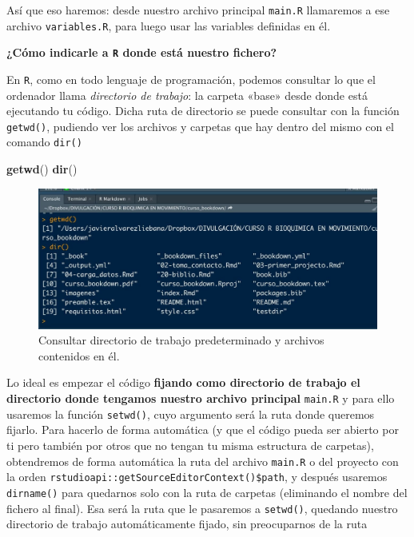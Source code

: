 \documentclass[11pt,]{book}
\newenvironment{Shaded}{\begin{snugshade}}{\end{snugshade}}
\newcommand{\KeywordTok}[1]{\textcolor[rgb]{0.27,0.27,0.27}{\textbf{#1}}}
\newcommand{\NormalTok}[1]{#1}
\begin{document}
Así que eso haremos: desde nuestro archivo principal \texttt{main.R} llamaremos a ese archivo \texttt{variables.R}, para luego usar las variables definidas en él.

\textbf{¿Cómo indicarle a \texttt{R} donde está nuestro fichero?}

En \texttt{R}, como en todo lenguaje de programación, podemos consultar lo que el ordenador llama \emph{directorio de trabajo}: la carpeta «base» desde donde está ejecutando tu código. Dicha ruta de directorio se puede consultar con la función \texttt{getwd()}, pudiendo ver los archivos y carpetas que hay dentro del mismo con el comando \texttt{dir()}

\begin{Shaded}
\begin{Highlighting}[]
\KeywordTok{getwd}\NormalTok{()}
\KeywordTok{dir}\NormalTok{()}
\end{Highlighting}
\end{Shaded}

\begin{figure}

{\centering \includegraphics[width=0.5\linewidth]{./img/getwd} 

}

\caption{Consultar directorio de trabajo predeterminado y archivos contenidos en él.}\label{fig:getwd}
\end{figure}

Lo ideal es empezar el código \textbf{fijando como directorio de trabajo el directorio donde tengamos nuestro archivo principal} \texttt{main.R} y para ello usaremos la función \texttt{setwd()}, cuyo argumento será la ruta donde queremos fijarlo. Para hacerlo de forma automática (y que el código pueda ser abierto por ti pero también por otros que no tengan tu misma estructura de carpetas), obtendremos de forma automática la ruta del archivo \texttt{main.R} o del proyecto con la orden \texttt{rstudioapi::getSourceEditorContext()\$path}, y después usaremos \texttt{dirname()} para quedarnos solo con la ruta de carpetas (eliminando el nombre del fichero al final). Esa será la ruta que le pasaremos a \texttt{setwd()}, quedando nuestro directorio de trabajo automáticamente fijado, sin preocuparnos de la ruta
\end{document}
